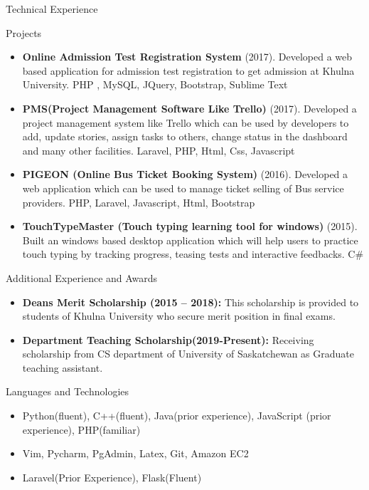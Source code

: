 \documentclass[]{mcdowellcv}
\begin{document}
	
	\begin{cvsection}{Technical Experience}
		\begin{cvsubsection}{Projects}{}{}
			\begin{itemize}
				\item \textbf{Online Admission Test Registration System} (2017). 
				Developed a web based application for admission test registration to get admission at Khulna University. PHP , MySQL, JQuery, Bootstrap, Sublime Text
				\item \textbf{PMS(Project Management Software Like Trello)} (2017). Developed a project management system like Trello which can be used by developers to add, update stories, assign tasks to others, change status in the dashboard and many other facilities.  Laravel, PHP, Html, Css, Javascript
				\item \textbf{PIGEON (Online Bus Ticket Booking System)} (2016). Developed a web application which can be used to manage ticket selling of Bus service providers. PHP, Laravel, Javascript, Html, Bootstrap
				\item \textbf{TouchTypeMaster (Touch typing learning tool for windows)} (2015). Built an windows based desktop application which will help users to practice touch typing by tracking progress, teasing tests and interactive feedbacks. C\#
			\end{itemize}
		\end{cvsubsection}
	\end{cvsection}
	
	
	\begin{cvsection}{Additional Experience and Awards}
		\begin{cvsubsection}{}{}{}	
			\begin{itemize}
				\item \textbf{Deans Merit Scholarship (2015 – 2018):} 
				This scholarship is provided to students of Khulna University who secure merit position in final exams.
				\item \textbf{Department Teaching Scholarship(2019-Present):} Receiving scholarship from CS department of University of Saskatchewan as Graduate teaching assistant.
			\end{itemize}
		\end{cvsubsection}
		
		
	\end{cvsection}
	
	\begin{cvsection}{Languages and Technologies}
		\begin{cvsubsection}{}{}{}	
			\begin{itemize}
				\item Python(fluent), C++(fluent), Java(prior experience), JavaScript (prior experience), PHP(familiar)  
				\item Vim, Pycharm, PgAdmin, Latex, Git, Amazon EC2
				\item Laravel(Prior Experience), Flask(Fluent)
			\end{itemize}
		\end{cvsubsection}
	\end{cvsection}
	
\end{document}
